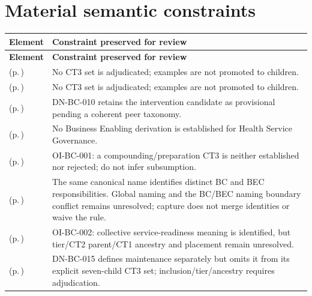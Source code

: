 \section{Material semantic constraints}
\begingroup\small\setlength{\TableWidth}{\dimexpr\linewidth-4\tabcolsep-3\arrayrulewidth\relax}
\begin{longtable}{|>{\raggedright\arraybackslash}p{0.38\TableWidth}|>{\raggedright\arraybackslash}p{0.62\TableWidth}|}
\hline\rowcolor{TableHead}\textbf{Element} & \textbf{Constraint preserved for review}\\\hline\endfirsthead
\hline\rowcolor{TableHead}\textbf{Element} & \textbf{Constraint preserved for review}\\\hline\endhead
\hline\endfoot
\nameref{cap:bc-clinical-determination} (p.\,\pageref{cap:bc-clinical-determination}) & No CT3 set is adjudicated; examples are not promoted to children.\\\hline
\nameref{cap:bc-individual-care-planning} (p.\,\pageref{cap:bc-individual-care-planning}) & No CT3 set is adjudicated; examples are not promoted to children.\\\hline
\nameref{cap:bc-clinical-intervention} (p.\,\pageref{cap:bc-clinical-intervention}) & DN-BC-010 retains the intervention candidate as provisional pending a coherent peer taxonomy.\\\hline
\nameref{cap:bc-health-service-governance} (p.\,\pageref{cap:bc-health-service-governance}) & No Business Enabling derivation is established for Health Service Governance.\\\hline
\nameref{cap:bc-medication-pharmacy-services} (p.\,\pageref{cap:bc-medication-pharmacy-services}) & OI-BC-001: a compounding/preparation CT3 is neither established nor rejected; do not infer subsumption.\\\hline
\nameref{cap:bc-health-information-exchange} (p.\,\pageref{cap:bc-health-information-exchange}) & The same canonical name identifies distinct BC and BEC responsibilities. Global naming and the BC/BEC naming boundary conflict remains unresolved; capture does not merge identities or waive the rule.\\\hline
\nameref{cap:bc-health-service-operational-readiness} (p.\,\pageref{cap:bc-health-service-operational-readiness}) & OI-BC-002: collective service-readiness meaning is identified, but tier/CT2 parent/CT1 ancestry and placement remain unresolved.\\\hline
\nameref{cap:bc-clinical-device-maintenance-management} (p.\,\pageref{cap:bc-clinical-device-maintenance-management}) & DN-BC-015 defines maintenance separately but omits it from its explicit seven-child CT3 set; inclusion/tier/ancestry requires adjudication.\\\hline

\end{longtable}
